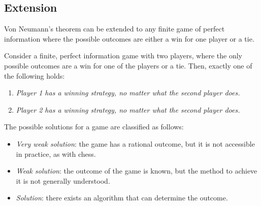 \subsection{Extension}
Von Neumann's theorem can be extended to any finite game of perfect information where the possible outcomes are either a win for one player or a tie. 
\begin{corollary}
    Consider a finite, perfect information game with two players, where the only possible outcomes are a win for one of the players or a tie. 
    Then, exactly one of the following holds:
\end{corollary}
\begin{enumerate}
    \item \textit{Player 1 has a winning strategy, no matter what the second player does.}
    \item \textit{Player 2 has a winning strategy, no matter what the second player does.}
\end{enumerate}
The possible solutions for a game are classified as follows:
\begin{itemize}
    \item \textit{Very weak solution}: the game has a rational outcome, but it is not accessible in practice, as with chess.
    \item \textit{Weak solution}: the outcome of the game is known, but the method to achieve it is not generally understood.
    \item \textit{Solution}: there exists an algorithm that can determine the outcome.
\end{itemize}
